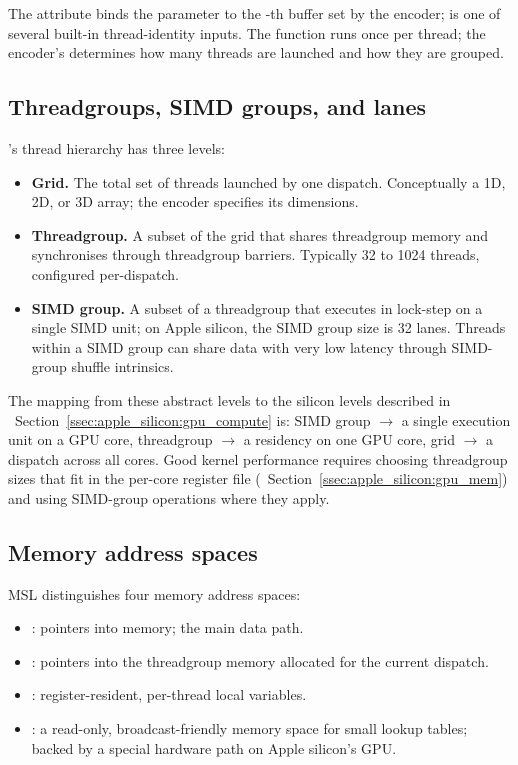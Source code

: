 The \code{[[buffer(N)]]} attribute binds the parameter to the
-th buffer set by the encoder; 
is one of several built-in thread-identity inputs. The function
runs once per thread; the encoder's
 determines how
many threads are launched and how they are grouped.

\subsection{Threadgroups, SIMD groups, and lanes}
\label{ssec:metal_mpsgraph:threadgroups}

\Metal's thread hierarchy has three levels:

\begin{itemize}
  \item \textbf{Grid.} The total set of threads launched by one
    dispatch. Conceptually a 1D, 2D, or 3D array; the encoder
    specifies its dimensions.
  \item \textbf{Threadgroup.} A subset of the grid that shares
    threadgroup memory and synchronises through threadgroup
    barriers. Typically 32 to 1024 threads, configured per-dispatch.
  \item \textbf{SIMD group.} A subset of a threadgroup that executes
    in lock-step on a single SIMD unit; on Apple silicon, the SIMD
    group size is 32 lanes. Threads within a SIMD group can share
    data with very low latency through SIMD-group shuffle
    intrinsics.
\end{itemize}

The mapping from these abstract levels to the silicon levels
described in ~Section~\ref{ssec:apple_silicon:gpu_compute}
is: SIMD group $\to$ a single execution unit on a GPU core,
threadgroup $\to$ a residency on one GPU core, grid $\to$ a
dispatch across all cores. Good kernel performance requires choosing
threadgroup sizes that fit in the per-core register file
(~Section~\ref{ssec:apple_silicon:gpu_mem})
and using SIMD-group operations where they apply.

\subsection{Memory address spaces}
\label{ssec:metal_mpsgraph:address_spaces}

MSL distinguishes four memory address spaces:

\begin{itemize}
  \item {}: pointers into  memory; the
    main data path.
  \item {}: pointers into the threadgroup memory
    allocated for the current dispatch.
  \item {}: register-resident, per-thread local
    variables.
  \item {}: a read-only, broadcast-friendly memory
    space for small lookup tables; backed by a special hardware
    path on Apple silicon's GPU.
\end{itemize}

